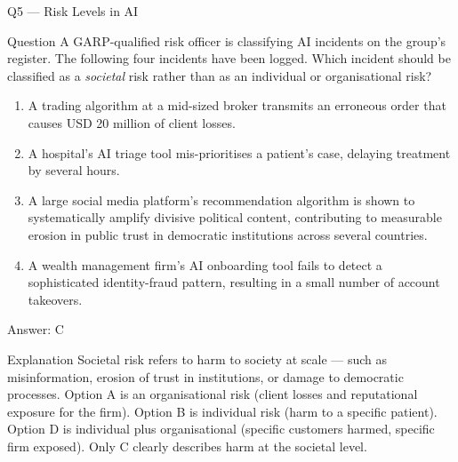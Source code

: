 \documentclass[aspectratio=169,8pt]{beamer}
\begin{document}
	\begin{frame}{Q5 --- Risk Levels in AI}
		\begin{block}{Question}
			A GARP-qualified risk officer is classifying AI incidents on the group's register. The following four incidents have been logged. Which incident should be classified as a \emph{societal} risk rather than as an individual or organisational risk?
		\end{block}
		\begin{enumerate}
			\item A trading algorithm at a mid-sized broker transmits an erroneous order that causes USD 20 million of client losses.
			\item A hospital's AI triage tool mis-prioritises a patient's case, delaying treatment by several hours.
			\item A large social media platform's recommendation algorithm is shown to systematically amplify divisive political content, contributing to measurable erosion in public trust in democratic institutions across several countries.
			\item A wealth management firm's AI onboarding tool fails to detect a sophisticated identity-fraud pattern, resulting in a small number of account takeovers.
		\end{enumerate}
		\begin{exampleblock}{Answer: C}\end{exampleblock}
		\begin{block}{Explanation}
			Societal risk refers to harm to society at scale --- such as misinformation, erosion of trust in institutions, or damage to democratic processes. Option A is an organisational risk (client losses and reputational exposure for the firm). Option B is individual risk (harm to a specific patient). Option D is individual plus organisational (specific customers harmed, specific firm exposed). Only C clearly describes harm at the societal level.
		\end{block}
	\end{frame}
	
\end{document}
